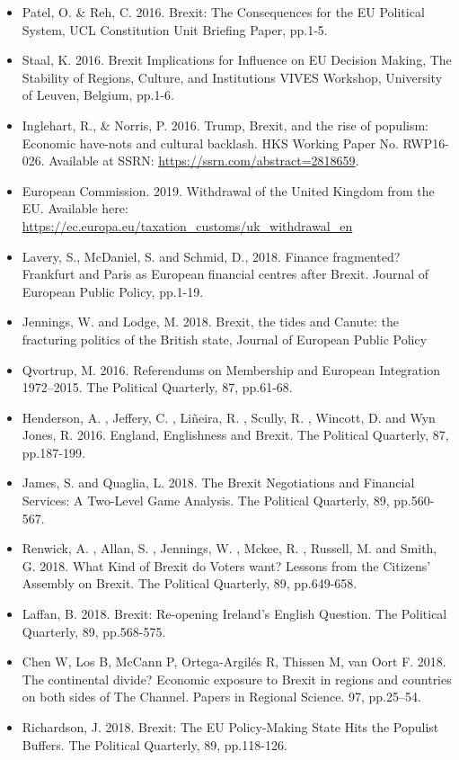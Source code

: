 \begin{itemize}
	\item Patel, O. \& Reh, C. 2016. Brexit: The Consequences for the EU Political System, UCL Constitution Unit Briefing Paper, pp.1-5. 
	\item Staal, K. 2016. Brexit Implications for Influence on EU Decision Making, The Stability of Regions, Culture, and Institutions VIVES Workshop, University of Leuven, Belgium, pp.1-6.
	\item Inglehart, R., \& Norris, P. 2016. Trump, Brexit, and the rise of populism: Economic have-nots and cultural backlash. HKS Working Paper No. RWP16-026. Available at SSRN: \url{https://ssrn.com/abstract=2818659}.
	\item European Commission. 2019. Withdrawal of the United Kingdom from the EU. Available here: \url{https://ec.europa.eu/taxation_customs/uk_withdrawal_en}
	\item Lavery, S., McDaniel, S. and Schmid, D., 2018. Finance fragmented? Frankfurt and Paris as European financial centres after Brexit. Journal of European Public Policy, pp.1-19.
	\item Jennings, W. and Lodge, M. 2018. Brexit, the tides and Canute: the fracturing politics of the British state, Journal of European Public Policy
	\item Qvortrup, M. 2016. Referendums on Membership and European Integration 1972–2015. The Political Quarterly, 87, pp.61-68.
	\item Henderson, A. , Jeffery, C. , Liñeira, R. , Scully, R. , Wincott, D. and Wyn Jones, R. 2016. England, Englishness and Brexit. The Political Quarterly, 87, pp.187-199.
	\item James, S. and Quaglia, L. 2018. The Brexit Negotiations and Financial Services: A Two-Level Game Analysis. The Political Quarterly, 89, pp.560-567.
	\item Renwick, A. , Allan, S. , Jennings, W. , Mckee, R. , Russell, M. and Smith, G. 2018. What Kind of Brexit do Voters want? Lessons from the Citizens’ Assembly on Brexit. The Political Quarterly, 89, pp.649-658.
	\item Laffan, B. 2018. Brexit: Re-opening Ireland's English Question. The Political Quarterly, 89, pp.568-575. 
	\item Chen W, Los B, McCann P, Ortega-Argilés R, Thissen M, van Oort F. 2018. The continental divide? Economic exposure to Brexit in regions and countries on both sides of The Channel. Papers in Regional Science. 97, pp.25–54.
	\item Richardson, J. 2018. Brexit: The EU Policy-Making State Hits the Populist Buffers. The Political Quarterly, 89, pp.118-126.

\end{itemize}
